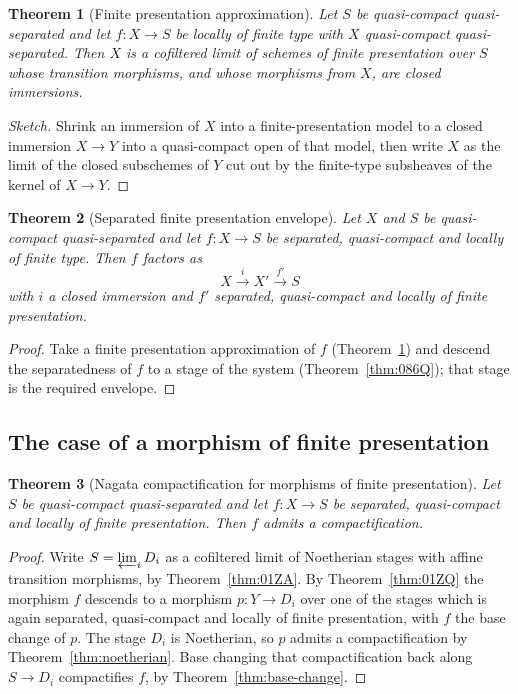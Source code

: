 \documentclass[11pt,a4paper]{article}
\theoremstyle{plain}
\newtheorem{theorem}{Theorem}[section]
\theoremstyle{definition}
\theoremstyle{remark}
\newcommand{\qcqs}{quasi-compact quasi-separated}
\begin{document}
\begin{theorem}[Finite presentation approximation]
\label{thm:09ZQ}
Let $S$ be \qcqs{} and let $f\colon X\to S$ be locally of finite type with $X$
\qcqs{}. Then $X$ is a cofiltered limit of schemes of finite presentation over
$S$ whose transition morphisms, and whose morphisms from $X$, are closed
immersions.
\end{theorem}

\begin{proof}[Sketch]
Shrink an immersion of $X$ into a finite-presentation model to a closed
immersion $X\to Y$ into a quasi-compact open of that model, then write $X$ as
the limit of the closed subschemes of $Y$ cut out by the finite-type subsheaves
of the kernel of $X\to Y$.
\end{proof}

\begin{theorem}[Separated finite presentation envelope]
\label{thm:01ZJ}
Let $X$ and $S$ be \qcqs{} and let $f\colon X\to S$ be separated, quasi-compact
and locally of finite type. Then $f$ factors as
\[
  X\xrightarrow{\;i\;}X'\xrightarrow{\;f'\;}S
\]
with $i$ a closed immersion and $f'$ separated, quasi-compact and locally of
finite presentation.
\end{theorem}

\begin{proof}
Take a finite presentation approximation of $f$ (Theorem~\ref{thm:09ZQ}) and
descend the separatedness of $f$ to a stage of the system
(Theorem~\ref{thm:086Q}); that stage is the required envelope.
\end{proof}

\subsection{The case of a morphism of finite presentation}

\begin{theorem}[Nagata compactification for morphisms of finite presentation]
\label{thm:fp-nagata}
Let $S$ be \qcqs{} and let $f\colon X\to S$ be separated, quasi-compact and
locally of finite presentation. Then $f$ admits a compactification.
\end{theorem}

\begin{proof}
Write $S=\varprojlim_i D_i$ as a cofiltered limit of Noetherian stages with
affine transition morphisms, by Theorem~\ref{thm:01ZA}. By
Theorem~\ref{thm:01ZQ} the morphism $f$ descends to a morphism $p\colon Y\to
D_i$ over one of the stages which is again separated, quasi-compact and locally
of finite presentation, with $f$ the base change of $p$. The stage $D_i$ is
Noetherian, so $p$ admits a compactification by Theorem~\ref{thm:noetherian}.
Base changing that compactification back along $S\to D_i$ compactifies $f$, by
Theorem~\ref{thm:base-change}.
\end{proof}
\end{document}
